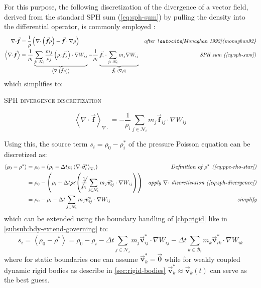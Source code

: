 \documentclass[oneside, a4paper]{book}
\newcommand{\equationnamed}[2]{%
  \setlength{\fboxsep}{2pt} %
  \setlength{\fboxrule}{0.01pt}
  \begin{center}
    \begin{minipage}{\textwidth}
      \begin{center}\textsc{#1}\end{center}
      #2
    \end{minipage}
  \end{center}
}
\newcommand\angled[1]{\left\langle#1\right\rangle}
\newcommand\vek[1]{\vec{\bm{#1}}}
\newcommand\br[1]{\left(#1\right)}
\newcommand\divergence{{\nabla\cdot}}
\begin{document}
    For this purpose, the following discretization of the divergence of a vector field, derived from the standard SPH sum (\autoref{eq:sph-sum}) by pulling the density into the differential operator, is commonly employed \autocites{monaghan92}{2014-survey-state-of-the-art-sph}: 
    \begin{align}
      \divergence \vek{f}&= \frac{1}{\rho}\br{\divergence \br{\vek{f}\rho} - \vek{f}\cdot\nabla\rho}
      &\textit{after \autocite[Monaghan 1992]{monaghan92}}\\
      \angled{\divergence \vek{f}} &= \frac{1}{\rho_i} \underbrace{\sum_{j\in\mathcal{N}_i}  \frac{m_j}{\rho_j} \br{\rho_j\vek{f}_j} \cdot \nabla W_{ij}}_{\angled{\divergence \br{\vek{f}\rho}}}
        - \frac{1}{\rho_i} \underbrace{\vek{f}_i \cdot \sum_{j\in\mathcal{N}_i}  m_j \nabla W_{ij}}_{\vek{f}_i\cdot \angled{\nabla\rho}}&\textit{SPH sum (\autoref{eq:sph-sum})}
    \end{align}
    which simplifies to:
    \equationnamed{SPH divergence discretization}{
      \begin{equation}
        \angled{\divergence \vek{f}}_{\divergence} = 
        -\frac{1}{\rho_i} \sum_{j\in\mathcal{N}_i}  
          m_j\vek{f}_{ij}\cdot\nabla W_{ij}
        \label{eq:sph-divergence}
      \end{equation}  
    }

    Using this, the source term $s_i=\rho_0-\rho^*_i$ of the pressure Poisson equation can be discretized as:
    \begin{align}
      \angled{\rho_0-\rho^*} &= \rho_0 - \br{\rho_i - \Delta t \rho_i \angled{\divergence \vek{v}^*_i}_\divergence} &\textit{Definition of $\rho^*$ (\autoref{eq:ppe-rho-star})}\\
      &= \rho_0 - \br{\rho_i + \Delta t \cancel{\rho_i} \br{\cancel{\frac{1}{\rho_i}} \sum_{j\in\mathcal{N}_i} m_j\vek{v}^*_{ij}\cdot\nabla W_{ij}}} &\textit{apply $\divergence$ discretization (\autoref{eq:sph-divergence})}\\
      &= \rho_0 - \rho_i - \Delta t \sum_{j\in\mathcal{N}_i}  m_j\vek{v}^*_{ij}\cdot\nabla W_{ij} &\textit{simplify}
    \end{align}
    which can be extended using the boundary handling of \autoref{chp:rigid} like in \autoref{subsub:bdy-extend-governing} to:
    \begin{equation}
      s_i = \angled{\rho_0-\rho^*} =
      \rho_0 - \rho_i 
      - \Delta t \sum_{j\in\mathcal{N}_i}  m_j\vek{v}^*_{ij}\cdot\nabla W_{ij} 
      - \Delta t \sum_{k\in\mathcal{B}_i}  m_k\vek{v}^*_{ik}\cdot\nabla W_{ik}
      \label{eq:iisph-source-term}
    \end{equation}
    where for static boundaries one can assume $\vek{v}^*_k=\vek{0}$ while for weakly coupled dynamic rigid bodies as describe in \autoref{sec:rigid-bodies} $\vek{v}^*_k \approx \vek{v}_k\br{t}$ can serve as the best guess. 
    
\end{document}
